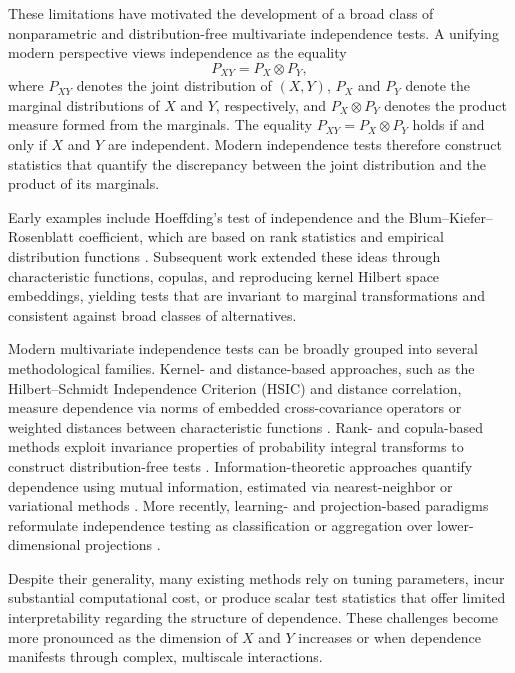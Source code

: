 \documentclass[12pt,reqno,oneside]{amsbook}
\theoremstyle{definition}
\theoremstyle{remark}
\begin{document}
These limitations have motivated the development of a broad class of
nonparametric and distribution-free multivariate independence tests. A unifying
modern perspective views independence as the equality
\[
P_{XY}=P_X\otimes P_Y,
\]
where $P_{XY}$ denotes the joint distribution of $(X,Y)$, $P_X$ and $P_Y$
denote the marginal distributions of $X$ and $Y$, respectively, and
$P_X\otimes P_Y$ denotes the product measure formed from the marginals.
The equality $P_{XY}=P_X\otimes P_Y$ holds if and only if $X$ and $Y$ are
independent. Modern independence tests therefore construct statistics that
quantify the discrepancy between the joint distribution and the product of its
marginals.

Early examples include Hoeffding’s test of independence and the
Blum--Kiefer--Rosenblatt coefficient, which are based on rank statistics and
empirical distribution functions \citep{Hoeffding1948,BlumKieferRosenblatt1961}.
Subsequent work extended these ideas through characteristic functions, copulas,
and reproducing kernel Hilbert space embeddings, yielding tests that are invariant
to marginal transformations and consistent against broad classes of
alternatives.

Modern multivariate independence tests can be broadly grouped into several
methodological families. Kernel- and distance-based approaches, such as the
Hilbert--Schmidt Independence Criterion (HSIC) and distance correlation, measure
dependence via norms of embedded cross-covariance operators or weighted distances
between characteristic functions \citep{Szekely2007,Gretton2005HSIC}.
Rank- and copula-based methods exploit invariance properties of probability
integral transforms to construct distribution-free tests
\citep{GenestRemillard2004,BergsmaDassios2014,HellerHellerGorfine2013AoS}.
Information-theoretic approaches quantify dependence using mutual information,
estimated via nearest-neighbor or variational methods
\citep{Kraskov2004,Belghazi2018MINE}.
More recently, learning- and projection-based paradigms reformulate independence
testing as classification or aggregation over lower-dimensional projections
\citep{LopezPazOquab2017C2ST,ChungLee2023JASA}.

Despite their generality, many existing methods rely on tuning parameters,
incur substantial computational cost, or produce scalar test statistics that
offer limited interpretability regarding the structure of dependence. These
challenges become more pronounced as the dimension of $X$ and $Y$ increases or
when dependence manifests through complex, multiscale interactions.
\end{document}
